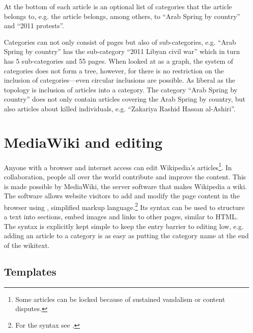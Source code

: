 At the bottom of each article is an optional list of categories that the article belongs to, e.g. the article  belongs, among others, to ``Arab Spring by country'' and ``2011 protests''.

Categories can not only consist of pages but also of sub-categories, e.g. ``Arab Spring by country'' has the sub-category ``2011 Libyan civil war'' which in turn has 5 sub-categories and 55 pages.
When looked at as a graph, the system of categories does not form a tree, however, for there is no restriction on the inclusion of categories---even circular inclusions are possible.
As liberal as the topology is inclusion of articles into a category.
The category ``Arab Spring by country'' does not only contain articles covering the Arab Spring by country, but also articles about killed individuals, e.g. ``Zakariya Rashid Hassan al-Ashiri''. 

\section{MediaWiki and editing}

Anyone with a browser and internet access can edit Wikipedia's articles\footnote{Some articles can be locked because of sustained vandalism or content disputes.\cite{wpprotectionpolicy}}.
In collaboration, people all over the world contribute and improve the content. 
This is made possible by MediaWiki, the server software that makes Wikipedia a wiki. 
The software allows website visitors to add and modify the page content in the browser using , simplified markup language.\footnote{For the syntax see .}
Its syntax can be used to structure a text into sections, embed images and links to other pages, similar to \ac{HTML}.
The syntax is explicitly kept simple to keep the entry barrier to editing low, e.g. adding an article  to a category is as easy as putting the category name at the end of the wikitext.

\subsection{Templates}\label{sub:templates}

